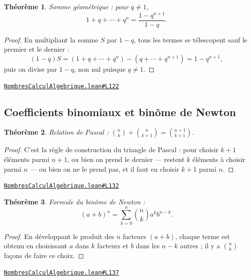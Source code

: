 \documentclass[11pt,a4paper]{article}
\theoremstyle{definition}
\theoremstyle{plain}
\newtheorem{theoreme}{Théorème}
\newcommand{\source}[2]{\par\smallskip\noindent\hfill{\footnotesize\href{#1}{\texttt{#2}}}\par\smallskip}
\begin{document}
\begin{theoreme}
Somme géométrique : pour $q \ne 1$,
\[ 1 + q + \cdots + q^n = \frac{1 - q^{n+1}}{1 - q} . \]
\end{theoreme}

\begin{proof}
En multipliant la somme $S$ par $1 - q$, tous les termes se télescopent sauf le premier
et le dernier :
\[ (1-q)S = (1 + q + \cdots + q^n) - (q + \cdots + q^{n+1}) = 1 - q^{n+1} , \]
puis on divise par $1 - q$, non nul puisque $q \ne 1$.
\end{proof}
\source{https://github.com/Commutator-IO/learn-lean/blob/main/cours/02-lycee/01-nombres-calcul-algebrique/NombresCalculAlgebrique.lean\#L122}{NombresCalculAlgebrique.lean\#L122}

\subsection{Coefficients binomiaux et binôme de Newton}

\begin{theoreme}
Relation de Pascal : $\binom{n}{k} + \binom{n}{k+1} = \binom{n+1}{k+1}$.
\end{theoreme}

\begin{proof}
C'est la règle de construction du triangle de Pascal : pour choisir $k+1$ éléments parmi
$n+1$, ou bien on prend le dernier — restent $k$ éléments à choisir parmi $n$ — ou bien on
ne le prend pas, et il faut en choisir $k+1$ parmi $n$.
\end{proof}
\source{https://github.com/Commutator-IO/learn-lean/blob/main/cours/02-lycee/01-nombres-calcul-algebrique/NombresCalculAlgebrique.lean\#L132}{NombresCalculAlgebrique.lean\#L132}

\begin{theoreme}
Formule du binôme de Newton :
\[ (a+b)^n = \sum_{k=0}^{n} \binom{n}{k} a^k b^{n-k} . \]
\end{theoreme}

\begin{proof}
En développant le produit des $n$ facteurs $(a+b)$, chaque terme est obtenu en
choisissant $a$ dans $k$ facteurs et $b$ dans les $n-k$ autres ; il y a $\binom{n}{k}$
façons de faire ce choix.
\end{proof}
\source{https://github.com/Commutator-IO/learn-lean/blob/main/cours/02-lycee/01-nombres-calcul-algebrique/NombresCalculAlgebrique.lean\#L137}{NombresCalculAlgebrique.lean\#L137}
\end{document}
